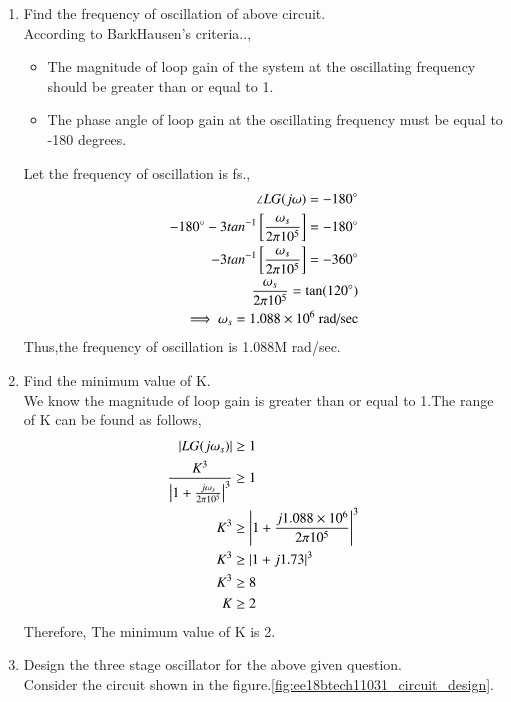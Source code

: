 \begin{enumerate}[label=\thesubsection.\arabic*.,ref=\thesubsection.\theenumi]
\item Find the frequency of oscillation of above circuit.\\
\solution According to BarkHausen's criteria..,
\begin{itemize}
    \item The magnitude of loop gain of the system at the oscillating frequency should be greater than or equal to 1.
    \item The phase angle of loop gain at the oscillating frequency must be equal to -180 degrees.
\end{itemize}
Let the frequency of oscillation is fs.,
\begin{align}
    \angle LG(j\omega) = -180\degree\\
    -180\degree - 3tan^{-1}{}\left[\frac{\omega_s}{2\pi10^5}\right] = -180\degree \\
    - 3tan^{-1}{}\left[\frac{\omega_s}{2\pi10^5}\right] = -360\degree\\
    \frac{\omega_s}{2\pi10^5} =  \tan(120\degree)\\
    \implies \omega_s = 1.088\times10^6\text{ rad/sec}
\end{align}
Thus,the frequency of oscillation is 1.088M rad/sec.
\item Find the minimum value of K.\\
\solution 
We know the magnitude of loop gain is greater than or equal to 1.The range of K can be found as follows,
\begin{align}
    \left\vert LG(j\omega_s)\right\vert &\geq 1 \\
    \frac{K^3}{\left\vert1+\frac{j\omega_s}{2\pi10^5}\right\vert^3} &\geq 1 \\
    K^3 &\geq \left\vert1+\frac{j1.088\times10^6}{2\pi10^5}\right\vert^3\\
     K^3 &\geq \left\vert1+j1.73\right\vert^3\\
     K^3 &\geq 8 \\
     K &\geq 2
\end{align}
Therefore, The minimum value of K is 2.
\item Design the three stage oscillator for the above given question.
\\
\solution Consider the circuit shown in the figure.\ref{fig:ee18btech11031_circuit_design}.\\
\begin{figure}[!hbt]
	\begin{center}
			\resizebox{\columnwidth}{!}{}

\end{center}
\end{figure}
\end{enumerate}
